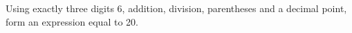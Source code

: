 Using exactly three digits 6, addition, division, parentheses and a decimal point, form an expression equal to 20.
